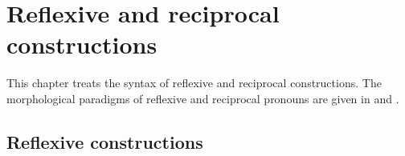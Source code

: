 \chapter{Reflexive and reciprocal constructions}
\label{cpt:Reflexive and reciprocal constructions}

This chapter treats the syntax of reflexive and reciprocal constructions. The morphological paradigms of reflexive and reciprocal pronouns are given in  and .



\section{Reflexive constructions}
\label{sec:Reflexive constructions}

